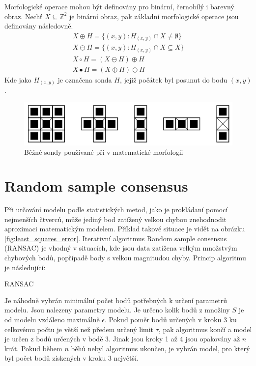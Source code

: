 \documentclass[twoside]{ctuthesis}
\begin{document}
Morfologické operace mohou být definovány pro binární, černobílý i barevný obraz. Nechť $X \subseteq \mathbb{Z}^2$ je binární obraz, pak základní morfologické operace jsou definovány následovně.\cite{comer1999morphological}
\begin{align}
    X \oplus H = \{ (x,y): H_{(x,y)} \cap X \neq \emptyset \} \\
    X \ominus H = \{ (x,y): H_{(x,y)} \cap X \subseteq X \} \\
    X \circ H = (X \ominus H) \oplus H \\
    X \bullet H = (X \oplus H) \ominus H
\end{align}
Kde jako $H_{(x,y)}$ je označena sonda $H$, jejiž počátek byl posunut do bodu $(x,y)$.

\begin{figure}
    \centering
    \includegraphics[width = \linewidth]{pictures/sondy_morfologie.png}
    \caption{Běžné sondy používané při v matematické morfologii}
    \label{fig:sondy}
\end{figure}

\section{Random sample consensus}
\label{sec:ransac}
Při určování modelu podle statistických metod, jako je prokládaní pomocí nejmenších čtverců, může jediný bod zatížený velkou chybou znehodnodit aproximaci matematickým modelem. Příklad takové situace je vidět na obrázku \ref{fig:least_squares_error}.
Iterativní algoritmus Random sample consensus (RANSAC) je vhodný v situacích, kde jsou data zatížena velkým množstvým chybových bodů, popřípadě body s velkou magnitudou chyby. Princip algoritmu je následující: \cite{derpanis2010overview}

\begin{algorithm}
    \caption{RANSAC}
    \label{alg:RANSAC}
    \begin{algorithmic}[1]
        \STATE Je náhodně vybrán minimální počet bodů potřebných k určení parametrů modelu.
        \STATE Jsou nalezeny parametry modelu.
        \STATE Je určeno kolik bodů z množiny $S$ je od modelu vzdáleno maximálně $\epsilon$. 
        \STATE Pokud poměr bodů určených v kroku 3 ku celkovému počtu je větší než předem určený limit $\tau$, pak algoritmus končí a model je určen z bodů určených v bodě 3.
        \STATE Jinak jsou kroky 1 až 4 jsou opakovány až $n$ krát.
        \STATE Pokud během $n$ běhů nebyl algoritmus ukončen, je vybrán model, pro který byl počet bodů získených v kroku 3 největší.
    \end{algorithmic}
\end{algorithm}
\end{document}
